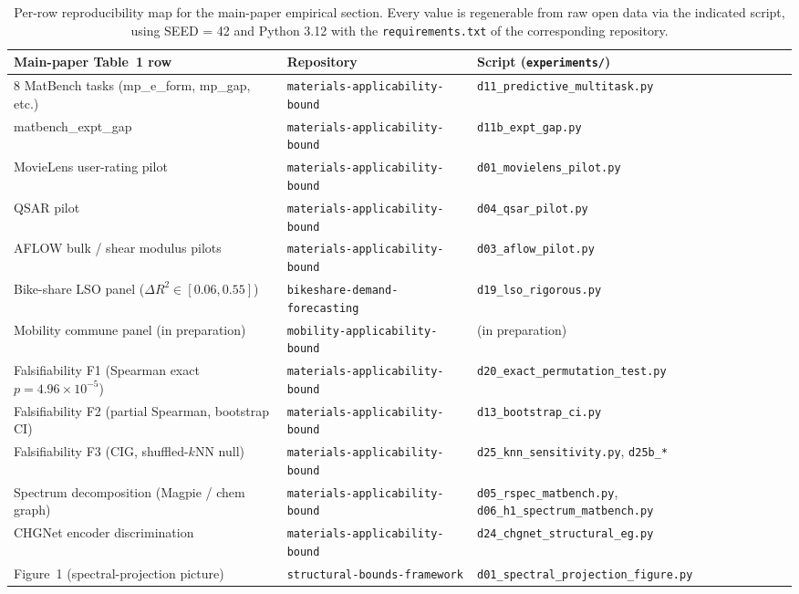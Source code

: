 \documentclass[11pt,a4paper]{article}
\theoremstyle{plain}
\theoremstyle{definition}
\theoremstyle{remark}
\begin{document}
\begin{table}[H]
\centering
\small
\begin{tabular}{lll}
\toprule
\textbf{Main-paper Table~1 row} & \textbf{Repository} & \textbf{Script (\texttt{experiments/})} \\
\midrule
8 MatBench tasks (mp\_e\_form, mp\_gap, etc.) & \texttt{materials-applicability-bound} & \texttt{d11\_predictive\_multitask.py} \\
matbench\_expt\_gap                            & \texttt{materials-applicability-bound} & \texttt{d11b\_expt\_gap.py} \\
MovieLens user-rating pilot                    & \texttt{materials-applicability-bound} & \texttt{d01\_movielens\_pilot.py} \\
QSAR pilot                                     & \texttt{materials-applicability-bound} & \texttt{d04\_qsar\_pilot.py} \\
AFLOW bulk / shear modulus pilots              & \texttt{materials-applicability-bound} & \texttt{d03\_aflow\_pilot.py} \\
Bike-share LSO panel ($\Delta R^2 \in [0.06, 0.55]$) & \texttt{bikeshare-demand-forecasting} & \texttt{d19\_lso\_rigorous.py} \\
Mobility commune panel (in preparation)        & \texttt{mobility-applicability-bound} & (in preparation) \\
\midrule
Falsifiability F1 (Spearman exact $p = 4.96 \times 10^{-5}$) & \texttt{materials-applicability-bound} & \texttt{d20\_exact\_permutation\_test.py} \\
Falsifiability F2 (partial Spearman, bootstrap CI)           & \texttt{materials-applicability-bound} & \texttt{d13\_bootstrap\_ci.py} \\
Falsifiability F3 (CIG, shuffled-$k$NN null)                 & \texttt{materials-applicability-bound} & \texttt{d25\_knn\_sensitivity.py}, \texttt{d25b\_*} \\
Spectrum decomposition (Magpie / chem graph)                 & \texttt{materials-applicability-bound} & \texttt{d05\_rspec\_matbench.py}, \texttt{d06\_h1\_spectrum\_matbench.py} \\
CHGNet encoder discrimination                                & \texttt{materials-applicability-bound} & \texttt{d24\_chgnet\_structural\_eg.py} \\
Figure~1 (spectral-projection picture)                       & \texttt{structural-bounds-framework} & \texttt{d01\_spectral\_projection\_figure.py} \\
\bottomrule
\end{tabular}
\caption{Per-row reproducibility map for the main-paper empirical
section.  Every value is regenerable from raw open data via the
indicated script, using SEED = 42 and Python 3.12 with the
\texttt{requirements.txt} of the corresponding repository.}
\label{tab:si-reproducibility}
\end{table}
\end{document}
